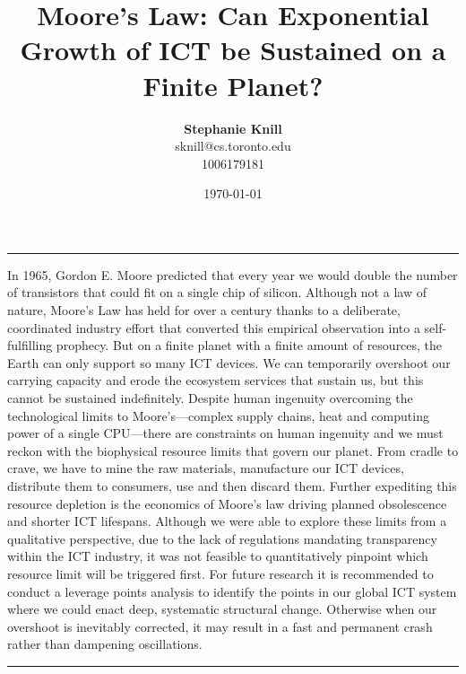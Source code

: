 \documentclass{article}
\begin{document}
\title{Moore's Law: Can Exponential Growth of ICT be Sustained on a Finite Planet?}
\author[1]{\textbf{Stephanie Knill} \\ sknill@cs.toronto.edu \\ 1006179181}
\date{\today}

\renewenvironment{abstract}
 {\quotation\small\noindent\rule{\linewidth}{.5pt}\par\smallskip
  {\centering\bfseries\abstractname\par}\medskip}
 {\par\noindent\rule{\linewidth}{.5pt}\endquotation}

\maketitle
\begin{abstract}
\noindent In 1965, Gordon E. Moore predicted that every year we would double the number of transistors that could fit on a single chip of silicon. Although not a law of nature, Moore's Law has held for over a century thanks to a deliberate, coordinated industry effort that converted this empirical observation into a self-fulfilling prophecy. But on a finite planet with a finite amount of resources, the Earth can only support so many ICT devices. We can temporarily overshoot our carrying capacity and erode the ecosystem services that sustain us, but this cannot be sustained indefinitely. %
Despite human ingenuity overcoming the technological limits to Moore's—complex supply chains, heat and computing power of a single CPU—there are constraints on human ingenuity and we must reckon with the biophysical resource limits that govern our planet.  From cradle to crave, we have to mine the raw materials, manufacture our ICT devices, distribute them to consumers, use and then discard them. Further expediting this resource depletion is the economics of Moore's law driving planned obsolescence and shorter ICT lifespans.
Although we were able to explore these limits from a qualitative perspective, due to the lack of regulations mandating transparency within the ICT industry, it was not feasible to quantitatively pinpoint which resource limit will be triggered first. For future research it is recommended to conduct a leverage points analysis to identify the points in our global ICT system where we could enact deep, systematic structural change. Otherwise when our overshoot is inevitably corrected, it may result in a fast and permanent crash rather than dampening oscillations.

\end{abstract}
\end{document}
